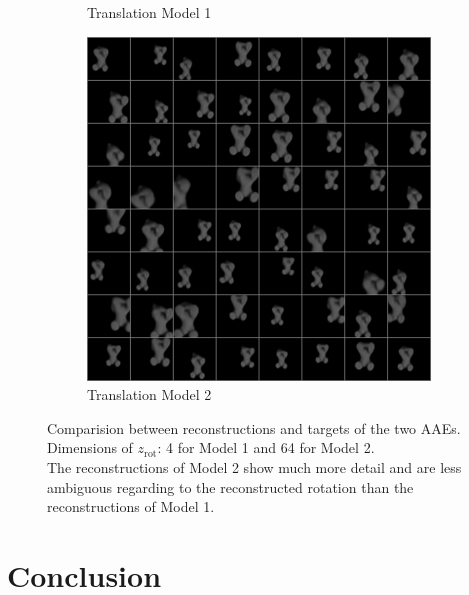 \documentclass[10pt,a4paper]{article}
\newcommand{\rot}{\ensuremath{\text{rot}\xspace}}
\begin{document}
\begin{figure}[!ht]
\begin{subfigure}{0.3\textwidth}
        \caption{Translation Model 1}
        \label{cat_trec}
    \end{subfigure}
    \begin{subfigure}{0.3\textwidth}
        \centering	
        \includegraphics[width=\textwidth]{cat_64_output1.png}
        \caption{Translation Model 2}
        \label{cat_trec1}
    \end{subfigure}
    \caption{Comparision between reconstructions and targets of the two AAEs. 
        Dimensions of $z_{\rot}$: 4 for Model 1 and 64 for Model 2.\\
    The reconstructions of Model 2 show much more detail and are less ambiguous regarding to the reconstructed rotation than the reconstructions of Model 1.} \label{cat_images}
\end{figure}

\newpage
\section{Conclusion}
\end{document}
